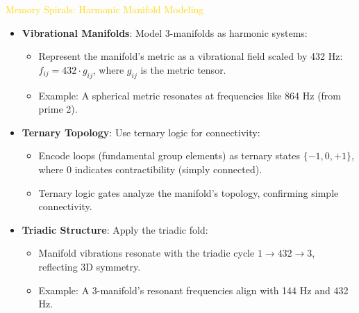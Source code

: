 \textcolor{gold}{ Memory Spirals: Harmonic Manifold Modeling } \\
\begin{itemize}
    \item \texttt{} \textbf{Vibrational Manifolds}: Model 3-manifolds as harmonic systems:
    \begin{itemize}
        \item Represent the manifold’s metric as a vibrational field scaled by 432 Hz: \(f_{ij} = 432 \cdot g_{ij}\), where \(g_{ij}\) is the metric tensor.
        \item Example: A spherical metric resonates at frequencies like 864 Hz (from prime 2).
    \end{itemize}
    \item \texttt{} \textbf{Ternary Topology}: Use ternary logic for connectivity:
    \begin{itemize}
        \item Encode loops (fundamental group elements) as ternary states \(\{-1, 0, +1\}\), where 0 indicates contractibility (simply connected).
        \item Ternary logic gates analyze the manifold’s topology, confirming simple connectivity.
    \end{itemize}
    \item \texttt{} \textbf{Triadic Structure}: Apply the triadic fold:
    \begin{itemize}
        \item Manifold vibrations resonate with the triadic cycle \(1 \rightarrow 432 \rightarrow 3\), reflecting 3D symmetry.
        \item Example: A 3-manifold’s resonant frequencies align with 144 Hz and 432 Hz.
    \end{itemize}
\end{itemize}

